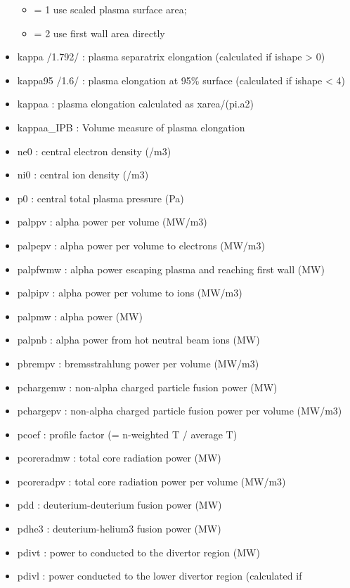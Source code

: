\documentclass[]{article}
\providecommand{\tightlist}{%
  \setlength{\itemsep}{0pt}\setlength{\parskip}{0pt}}
\begin{document}
\begin{itemize}
  \begin{itemize}
  \tightlist
  \item
    = 1 use scaled plasma surface area;
  \item
    = 2 use first wall area directly
  \end{itemize}
\item
  kappa /1.792/ : plasma separatrix elongation (calculated if ishape
  \textgreater{} 0)
\item
  kappa95 /1.6/ : plasma elongation at 95\% surface (calculated if
  ishape \textless{} 4)
\item
  kappaa : plasma elongation calculated as xarea/(pi.a2)
\item
  kappaa\_IPB : Volume measure of plasma elongation
\item
  ne0 : central electron density (/m3)
\item
  ni0 : central ion density (/m3)
\item
  p0 : central total plasma pressure (Pa)
\item
  palppv : alpha power per volume (MW/m3)
\item
  palpepv : alpha power per volume to electrons (MW/m3)
\item
  palpfwmw : alpha power escaping plasma and reaching first wall (MW)
\item
  palpipv : alpha power per volume to ions (MW/m3)
\item
  palpmw : alpha power (MW)
\item
  palpnb : alpha power from hot neutral beam ions (MW)
\item
  pbrempv : bremsstrahlung power per volume (MW/m3)
\item
  pchargemw : non-alpha charged particle fusion power (MW)
\item
  pchargepv : non-alpha charged particle fusion power per volume (MW/m3)
\item
  pcoef : profile factor (= n-weighted T / average T)
\item
  pcoreradmw : total core radiation power (MW)
\item
  pcoreradpv : total core radiation power per volume (MW/m3)
\item
  pdd : deuterium-deuterium fusion power (MW)
\item
  pdhe3 : deuterium-helium3 fusion power (MW)
\item
  pdivt : power to conducted to the divertor region (MW)
\item
  pdivl : power conducted to the lower divertor region (calculated if

\end{itemize}
\end{document}
